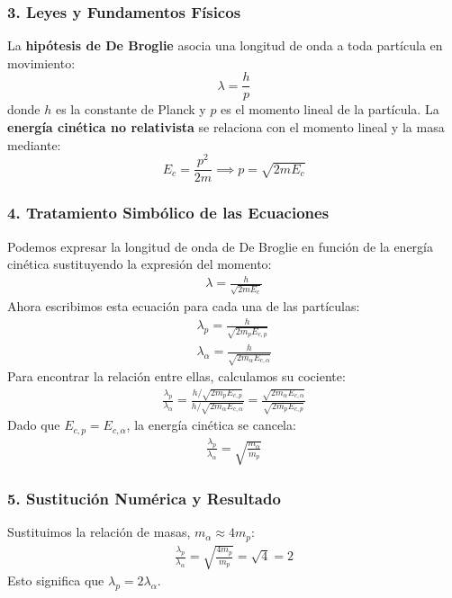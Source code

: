 \subsubsection*{3. Leyes y Fundamentos Físicos}
La \textbf{hipótesis de De Broglie} asocia una longitud de onda a toda partícula en movimiento:
$$ \lambda = \frac{h}{p} $$
donde $h$ es la constante de Planck y $p$ es el momento lineal de la partícula.
La \textbf{energía cinética no relativista} se relaciona con el momento lineal y la masa mediante:
$$ E_c = \frac{p^2}{2m} \implies p = \sqrt{2mE_c} $$

\subsubsection*{4. Tratamiento Simbólico de las Ecuaciones}
Podemos expresar la longitud de onda de De Broglie en función de la energía cinética sustituyendo la expresión del momento:
\begin{gather}
    \lambda = \frac{h}{\sqrt{2mE_c}}
\end{gather}
Ahora escribimos esta ecuación para cada una de las partículas:
\begin{gather}
    \lambda_p = \frac{h}{\sqrt{2m_p E_{c,p}}} \\
    \lambda_{\alpha} = \frac{h}{\sqrt{2m_{\alpha} E_{c,\alpha}}}
\end{gather}
Para encontrar la relación entre ellas, calculamos su cociente:
\begin{gather}
    \frac{\lambda_p}{\lambda_{\alpha}} = \frac{h/\sqrt{2m_p E_{c,p}}}{h/\sqrt{2m_{\alpha} E_{c,\alpha}}} = \frac{\sqrt{2m_{\alpha} E_{c,\alpha}}}{\sqrt{2m_p E_{c,p}}}
\end{gather}
Dado que $E_{c,p} = E_{c,\alpha}$, la energía cinética se cancela:
\begin{gather}
    \frac{\lambda_p}{\lambda_{\alpha}} = \sqrt{\frac{m_{\alpha}}{m_p}}
\end{gather}

\subsubsection*{5. Sustitución Numérica y Resultado}
Sustituimos la relación de masas, $m_{\alpha} \approx 4m_p$:
\begin{gather}
    \frac{\lambda_p}{\lambda_{\alpha}} = \sqrt{\frac{4m_p}{m_p}} = \sqrt{4} = 2
\end{gather}
Esto significa que $\lambda_p = 2\lambda_{\alpha}$.

